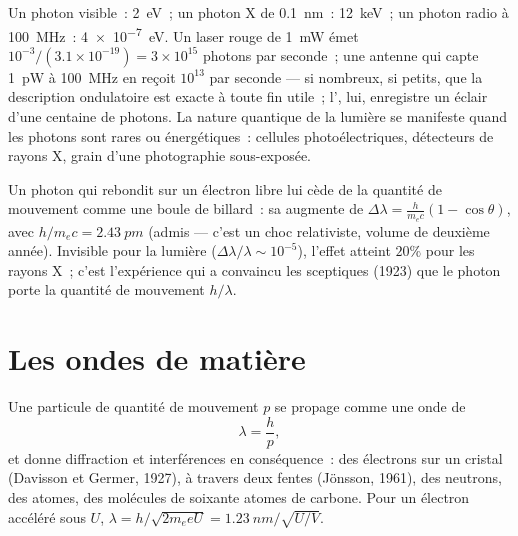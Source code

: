 \begin{example}\label{ex:b1:quantum-introduction:orders}
Un photon visible~: \qty{2}{eV}~; un photon X de \qty{0.1}{nm}~: \qty{12}{keV}~;
un photon radio à \qty{100}{MHz}~: \qty{4e-7}{eV}. Un laser rouge de \qty{1}{mW}
émet $10^{-3}/(3.1 \times 10^{-19}) = 3 \times 10^{15}$ photons par seconde~;
une antenne qui capte \qty{1}{pW} à \qty{100}{MHz} en reçoit $10^{13}$
par seconde --- si nombreux, si petits, que la description ondulatoire est
exacte à toute fin utile~; l', lui, enregistre un éclair d'une
centaine de photons. La nature quantique de la lumière se manifeste
quand les photons sont rares ou énergétiques~: cellules photoélectriques,
détecteurs de rayons X, grain d'une photographie sous-exposée.
\end{example}

\begin{remark}\label{rem:b1:quantum-introduction:compton}
Un photon qui rebondit sur un électron libre lui cède de la quantité de
mouvement comme une boule de billard~: sa  augmente de
$\Delta\lambda = \frac{h}{m_ec}(1 -
\cos\theta)$, avec $h/m_ec = \qty{2.43}{pm}$ (admis --- c'est un choc
relativiste, volume de deuxième année). Invisible pour la lumière ($\Delta\lambda/\lambda \sim 10^{-5}$),
l'effet atteint $20\%$ pour les rayons X~; c'est l'expérience qui a
convaincu les sceptiques (1923) que le photon porte la quantité de
mouvement $h/\lambda$.
\end{remark}

\section{Les ondes de matière}

\begin{theorem}[de Broglie]\label{thm:b1:quantum-introduction:debroglie}
Une particule de quantité de mouvement $p$ se propage comme une onde de 
\[
\lambda = \frac{h}{p} ,
\]
et donne diffraction et interférences en conséquence~: des électrons sur un
cristal (Davisson et Germer, 1927), à travers deux fentes (Jönsson, 1961),
des neutrons, des atomes, des molécules de soixante atomes de carbone. Pour un
électron accéléré sous $U$, $\lambda = h/\sqrt{2m_eeU} = \qty{1.23}{nm}/\sqrt{U/\unit{V}}$.
\end{theorem}
\admitted

